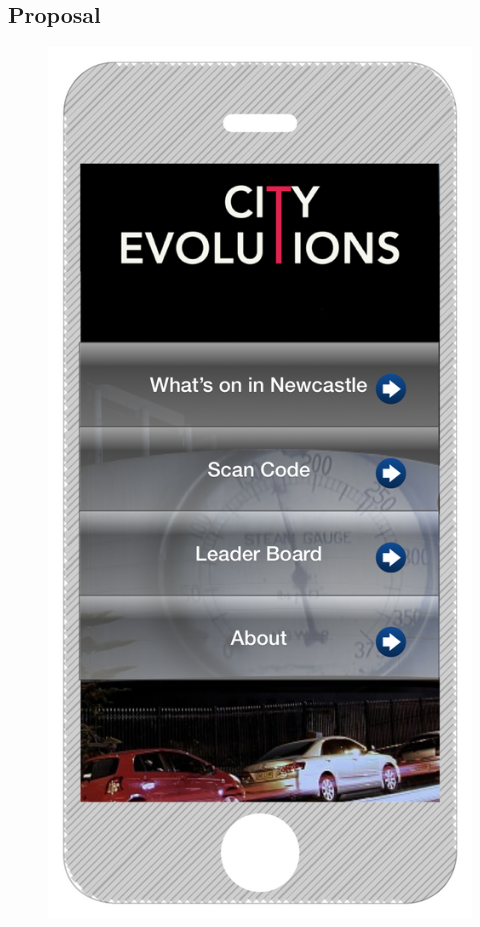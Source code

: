 \documentclass[a4paper,12pt]{article}
\begin{document}
\newpage
\subsection{Proposal}

\begin{figure}
\centering
\begin{minipage}{.5\textwidth}
  \centering
  \includegraphics[width=.6\linewidth]{./images/iphone-interface}
  \label{iphone-interface-startscreen}
\end{minipage}%
\begin{minipage}{.5\textwidth}
  \centering

\end{minipage}
\end{figure}
\end{document}
